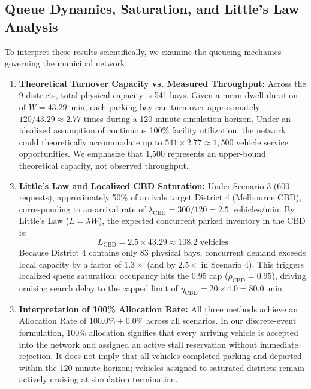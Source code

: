 \documentclass[journal]{IEEEtran}
\begin{document}
\subsection{Queue Dynamics, Saturation, and Little's Law Analysis}
To interpret these results scientifically, we examine the queueing mechanics governing the municipal network:
\begin{enumerate}
    \item \textbf{Theoretical Turnover Capacity vs. Measured Throughput:} Across the 9 districts, total physical capacity is 541 bays. Given a mean dwell duration of $W = 43.29$~min, each parking bay can turn over approximately $120 / 43.29 \approx 2.77$ times during a 120-minute simulation horizon. Under an idealized assumption of continuous 100\% facility utilization, the network could theoretically accommodate up to $541 \times 2.77 \approx 1,500$ vehicle service opportunities. We emphasize that 1,500 represents an upper-bound theoretical capacity, not observed throughput.
    \item \textbf{Little's Law and Localized CBD Saturation:} Under Scenario 3 (600 requests), approximately 50\% of arrivals target District 4 (Melbourne CBD), corresponding to an arrival rate of $\lambda_{\text{CBD}} = 300 / 120 = 2.5$~vehicles/min. By Little's Law ($L = \lambda W$), the expected concurrent parked inventory in the CBD is:
    \begin{equation}
    L_{\text{CBD}} = 2.5 \times 43.29 \approx 108.2\text{ vehicles}
    \end{equation}
    Because District 4 contains only 83 physical bays, concurrent demand exceeds local capacity by a factor of $1.3\times$ (and by $2.5\times$ in Scenario 4). This triggers localized queue saturation: occupancy hits the 0.95 cap ($\rho_{\text{CBD}} = 0.95$), driving cruising search delay to the capped limit of $\eta_{\text{CBD}} = 20 \times 4.0 = 80.0$~min.
    \item \textbf{Interpretation of 100\% Allocation Rate:} All three methods achieve an Allocation Rate of $100.0\% \pm 0.0\%$ across all scenarios. In our discrete-event formulation, 100\% allocation signifies that every arriving vehicle is accepted into the network and assigned an active stall reservation without immediate rejection. It does not imply that all vehicles completed parking and departed within the 120-minute horizon; vehicles assigned to saturated districts remain actively cruising at simulation termination.
\end{enumerate}
\end{document}
